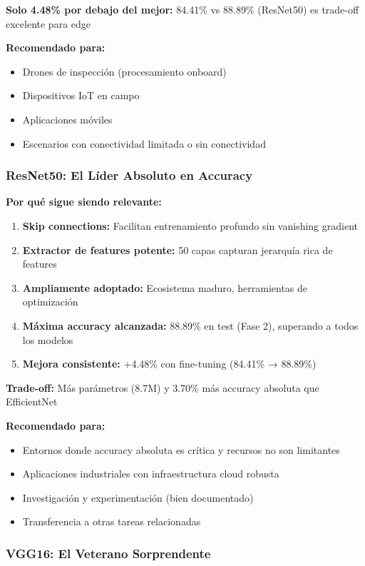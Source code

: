 \documentclass[11pt, a4paper]{article}
\begin{document}
\textbf{Solo 4.48\% por debajo del mejor:} 84.41\% vs 88.89\% (ResNet50) es trade-off excelente para edge

\textbf{Recomendado para:}
\begin{itemize}
    \item Drones de inspección (procesamiento onboard)
    \item Dispositivos IoT en campo
    \item Aplicaciones móviles
    \item Escenarios con conectividad limitada o sin conectividad
\end{itemize}

\subsubsection{ResNet50: El Líder Absoluto en Accuracy}

\textbf{Por qué sigue siendo relevante:}

\begin{enumerate}
    \item \textbf{Skip connections:} Facilitan entrenamiento profundo sin vanishing gradient
    \item \textbf{Extractor de features potente:} 50 capas capturan jerarquía rica de features
    \item \textbf{Ampliamente adoptado:} Ecosistema maduro, herramientas de optimización
    \item \textbf{Máxima accuracy alcanzada:} 88.89\% en test (Fase 2), superando a todos los modelos
    \item \textbf{Mejora consistente:} +4.48\% con fine-tuning (84.41\% → 88.89\%)
\end{enumerate}

\textbf{Trade-off:} Más parámetros (8.7M) y 3.70\% más accuracy absoluta que EfficientNet

\textbf{Recomendado para:}
\begin{itemize}
    \item Entornos donde accuracy absoluta es crítica y recursos no son limitantes
    \item Aplicaciones industriales con infraestructura cloud robusta
    \item Investigación y experimentación (bien documentado)
    \item Transferencia a otras tareas relacionadas
\end{itemize}

\subsubsection{VGG16: El Veterano Sorprendente}
\end{document}
